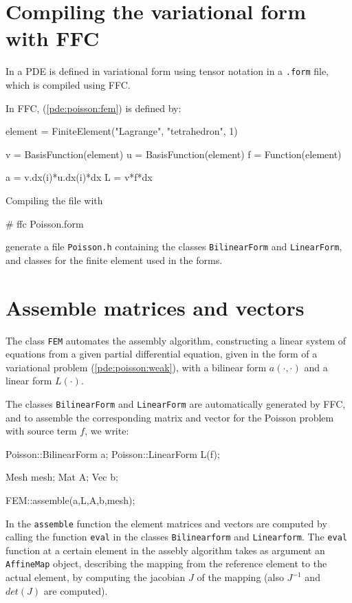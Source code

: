 \section{Compiling the variational form with FFC}

In \dolfin{} a PDE is defined in variational form using tensor notation 
in a \texttt{.form} file, which is compiled using FFC. 

In FFC, (\ref{pde:poisson:fem}) is defined by:  
\begin{code}
element = FiniteElement("Lagrange", "tetrahedron", 1)

v = BasisFunction(element)
u = BasisFunction(element)
f = Function(element)

a = v.dx(i)*u.dx(i)*dx
L = v*f*dx
\end{code}

Compiling the file with 
\begin{code}
# ffc Poisson.form
\end{code}
generate a file \texttt{Poisson.h} containing the classes 
\texttt{BilinearForm} and \texttt{LinearForm}, and 
classes for the finite element used in the forms. 

\section{Assemble matrices and vectors}

The class \texttt{FEM} automates the assembly algorithm, constructing a linear 
system of equations from a given partial differential equation, 
given in the form of a variational problem (\ref{pde:poisson:weak}), 
with a bilinear form $a(\cdot,\cdot)$ and a linear form $L(\cdot)$. 

The classes \texttt{BilinearForm} and \texttt{LinearForm} are automatically 
generated by FFC, and to assemble the corresponding matrix and vector for 
the Poisson problem with source term $f$, we write:  
\begin{code}
Poisson::BilinearForm a;
Poisson::LinearForm L(f);

Mesh mesh; 
Mat A;
Vec b;

FEM::assemble(a,L,A,b,mesh);
\end{code}

In the \texttt{assemble} function the element matrices and vectors are 
computed by calling the function \texttt{eval} in the classes 
\texttt{Bilinearform} and \texttt{Linearform}. 
The \texttt{eval} function at a certain element in the assebly algorithm 
takes as argument an \texttt{AffineMap} object, 
describing the mapping from the reference element to the actual element, 
by computing the jacobian $J$ of the mapping (also $J^{-1}$ and $det(J)$ 
are computed).  

